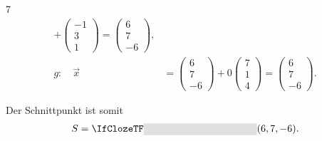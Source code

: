 \begin{tcolorbox}
\begin{ClozeArea}[34]{7}
\[\begin{aligned}
            +\begin{pmatrix}-1\\3\\1\end{pmatrix}
            =\begin{pmatrix}6\\7\\-6\end{pmatrix},\\[1em]
        g:\quad
        \vec x
          &=\begin{pmatrix}6\\7\\-6\end{pmatrix}
            +0\begin{pmatrix}7\\1\\4\end{pmatrix}
            =\begin{pmatrix}6\\7\\-6\end{pmatrix}.
      \end{aligned}
    \]
  \end{ClozeArea}
  Der Schnittpunkt ist somit
  \[
    S=\Cloze{4cm}{(6,7,-6)}.
  \]
\end{tcolorbox}
